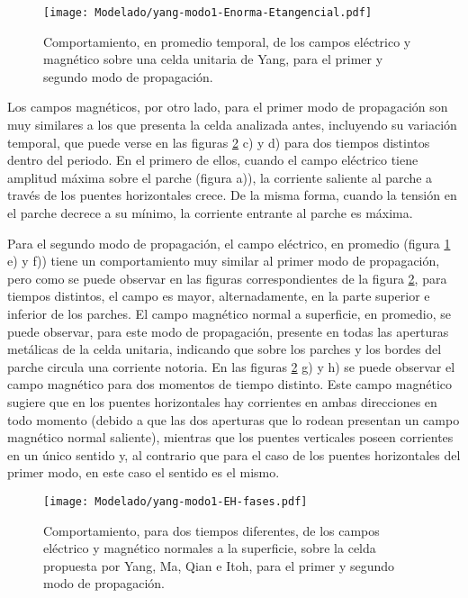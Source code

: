 \begin{figure}[h]
	\centering
	\texttt{[image: Modelado/yang-modo1-Enorma-Etangencial.pdf]}
	\caption{Comportamiento, en promedio temporal, de los campos eléctrico y magnético sobre una celda unitaria de Yang, para el primer y segundo modo de propagación.}
	\label{fig:yang-analisis-campos}
\end{figure}

Los campos magnéticos, por otro lado, para el primer modo de propagación son muy similares a los que presenta la celda analizada antes, incluyendo su variación temporal, que puede verse en las figuras \ref{fig:yang-analisis-campos-fases} c) y d) para dos tiempos distintos dentro del periodo. En el primero de ellos, cuando el campo eléctrico tiene amplitud máxima sobre el parche (figura a)), la corriente saliente al parche a través de los puentes horizontales crece. De la misma forma, cuando la tensión en el parche decrece a su mínimo, la corriente entrante al parche es máxima.

Para el segundo modo de propagación, el campo eléctrico, en promedio (figura \ref{fig:yang-analisis-campos} e) y f)) tiene un comportamiento muy similar al primer modo de propagación, pero como se puede observar en las figuras correspondientes de la figura \ref{fig:yang-analisis-campos-fases}, para tiempos distintos, el campo es mayor, alternadamente, en la parte superior e inferior de los parches. El campo magnético normal a superficie, en promedio, se puede observar, para este modo de propagación, presente en todas las aperturas metálicas de la celda unitaria, indicando que sobre los parches y los bordes del parche circula una corriente notoria. En las figuras \ref{fig:yang-analisis-campos-fases} g) y h) se puede observar el campo magnético para dos momentos de tiempo distinto. Este campo magnético sugiere que en los puentes horizontales hay corrientes en ambas direcciones en todo momento (debido a que las dos aperturas que lo rodean presentan un campo magnético normal saliente), mientras que los puentes verticales poseen corrientes en un único sentido y, al contrario que para el caso de los puentes horizontales del primer modo, en este caso el sentido es el mismo.

\begin{figure}[h]
	\centering
	\texttt{[image: Modelado/yang-modo1-EH-fases.pdf]}
	\caption{Comportamiento, para dos tiempos diferentes, de los campos eléctrico y magnético normales a la superficie, sobre la celda propuesta por Yang, Ma, Qian e Itoh, para el primer y segundo modo de propagación.}
	\label{fig:yang-analisis-campos-fases}
\end{figure}



